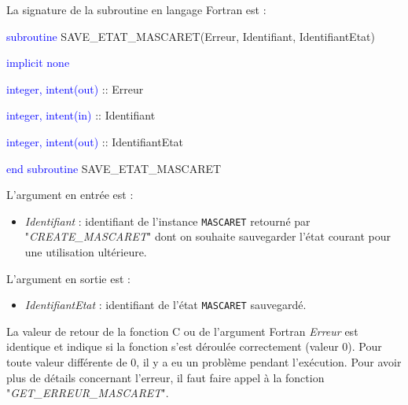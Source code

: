 \documentclass[a4paper,11pt]{article}
\begin{document}
 La signature de la subroutine en langage Fortran est :
 
 \vspace{0.5cm}
 
    \textcolor{blue}{subroutine} SAVE\_ETAT\_MASCARET(Erreur, Identifiant, IdentifiantEtat)
    
        \hspace{1cm}\textcolor{blue}{implicit none}                 
        
        \hspace{1cm} \textcolor{blue}{integer, intent(out)} :: Erreur
        
        \hspace{1cm} \textcolor{blue}{integer, intent(in)}  :: Identifiant
        
        \hspace{1cm} \textcolor{blue}{integer, intent(out)}  :: IdentifiantEtat
        
    \textcolor{blue}{end subroutine} SAVE\_ETAT\_MASCARET

 \vspace{0.5cm}

 L'argument en entr\'ee est :
 \vspace{0.5cm}
 \begin{itemize}
    \item \textit{Identifiant} : identifiant de l'instance \texttt{MASCARET} retourn\'e par "\textit{CREATE\_MASCARET}" dont on souhaite sauvegarder l'\'etat courant pour une utilisation ult\'erieure.
 \end{itemize}

 \vspace{0.5cm}

 L'argument en sortie est :
 \vspace{0.5cm}
 \begin{itemize}
    \item \textit{IdentifiantEtat} : identifiant de l'\'etat \texttt{MASCARET} sauvegard\'e.
 \end{itemize}

 \vspace{0.5cm}
 
 La valeur de retour de la fonction C ou de l'argument Fortran \textit{Erreur} est identique et indique si la fonction s'est d\'eroul\'ee correctement (valeur 0). Pour toute valeur diff\'erente de 0, il y a eu un probl\`eme pendant l'ex\'ecution. Pour avoir plus de d\'etails concernant l'erreur, il faut faire appel \`a la fonction "\textit{GET\_ERREUR\_MASCARET}".
\end{document}
